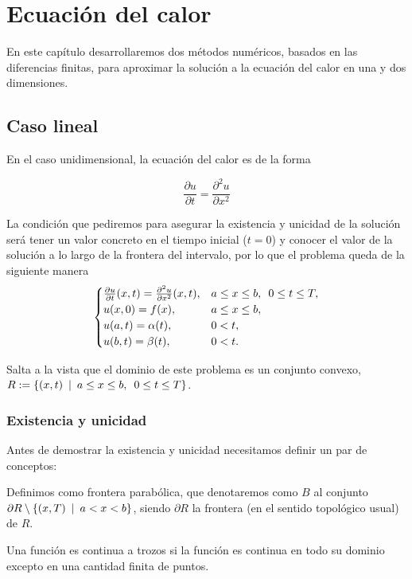 \chapter{Ecuación del calor}
\label{cap:heat}
\begin{resumen}
	En este capítulo desarrollaremos dos métodos numéricos, basados en las diferencias finitas, para aproximar la solución a la ecuación del calor en una  y dos dimensiones.
\end{resumen}

\section{Caso lineal}
En el caso unidimensional, la ecuación del calor es de la forma

\begin{equation}
	\frac{\partial u}{\partial t} = \frac{\partial ^2u}{\partial x^2}
\end{equation}

La condición que pediremos para asegurar la existencia y unicidad de la solución será tener un valor concreto en el tiempo inicial ($t=0$) y conocer el valor de la solución a lo largo de la frontera del intervalo, por lo que el problema queda de la siguiente manera
\begin{equation}\label{eq:1dheat}
	\begin{cases} 
		\frac{\partial u}{\partial t}(x,t) = \frac{\partial ^2u}{\partial x^2}(x,t), & a\leq x\leq b, \hspace{5px} 0\leq t \leq T,\\
		u(x,0)=f(x), & a\leq x\leq b, \\
		u(a,t)=\alpha(t), & 0<t,\\
		u(b,t)=\beta(t), & 0<t.
	\end{cases}
\end{equation}


Salta a la vista que el dominio de este problema es un conjunto convexo, $R:=\{(x,t)\hspace{5px}|\hspace{5px} a\leq x \leq b, \hspace{5px} 0\leq t \leq T\}$.
\subsection{Existencia y unicidad}

Antes de demostrar la existencia y unicidad necesitamos definir un par de conceptos:
\begin{definicion}
	Definimos como frontera parabólica, que denotaremos como $B$ al conjunto $\partial R \setminus \{(x,T)\hspace{5px} | \hspace{5px} a < x < b\}$, siendo $\partial R$ la frontera (en el sentido topológico usual) de $R$.
\end{definicion}
\begin{definicion}
	Una función es continua a trozos si la función es continua en todo su dominio excepto en una cantidad finita de puntos.
\end{definicion}

